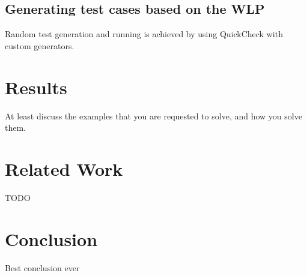 \documentclass[a4paper]{article}
\begin{document}
\subsection{Generating test cases based on the WLP}

Random test generation and running is achieved by using QuickCheck \cite{claessen2011quickcheck}
with custom generators.

\section{Results}

At least discuss the examples that you are requested
to solve, and how you solve them.

\section{Related Work}

TODO

\section{Conclusion}

Best conclusion ever



\end{document}
